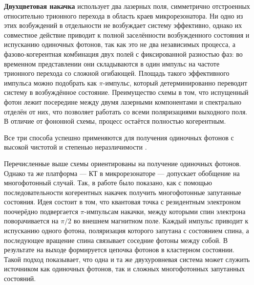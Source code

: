 \documentclass[11pt]{article}    %
\numberwithin{equation}{section}
\begin{document}
\textbf{Двухцветовая накачка} \cite{he2019} использует два
лазерных поля, симметрично отстроенных относительно трионного перехода в область краев микрорезонатора. %
Ни одно из этих возбуждений в отдельности не
возбуждает систему эффективно, однако их совместное действие приводит к
полной заселённости возбужденного состояния и испусканию одиночных фотонов,
так как это не два независимых процесса, а фазово-когерентная
комбинация двух полей с фиксированной разностью фаз:
во временном представлении они складываются в один импульс на частоте
трионного перехода со сложной огибающей. Площадь такого
эффективного импульса можно подобрать как $\pi$-импульс, который
детерминированно переводит систему в возбуждённое состояние.
Преимущество схемы в том, что испущенный фотон лежит посередине между
двумя лазерными компонентами и спектрально отделён от них, что позволяет
работать со всеми поляризациями выходного поля. В отличие от фононной
схемы, процесс остаётся полностью когерентным.

Все три способа успешно применяются для получения одиночных фотонов с высокой
чистотой и степенью неразличимости \cite{senellart2017, tomm2021, ramsay2010, nazir2016}.

Перечисленные выше схемы ориентированы на получение одиночных фотонов.
Однако та же платформа --- КТ в микрорезонаторе --- допускает
обобщение на многофотонный случай. Так, в работе \cite{lindner2009} было
показано, как с помощью последовательности когерентных накачек получить
многофотонные запутанные состояния. Идея состоит в том, что квантовая
точка с резидентным электроном поочерёдно подвергается $\pi$-импульсам
накачки, между которыми спин электрона поворачивается на $\pi/2$ во внешнем магнитном
поле. Каждый импульс приводит к испусканию
одного фотона, поляризация которого запутана с состоянием спина, а
последующее вращение спина связывает соседние фотоны между собой. В
результате на выходе формируется цепочка фотонов в кластерном
состоянии.
Такой подход показывает, что одна и та же двухуровневая система может
служить источником как одиночных фотонов, так и сложных многофотонных
запутанных состояний.
\end{document}
